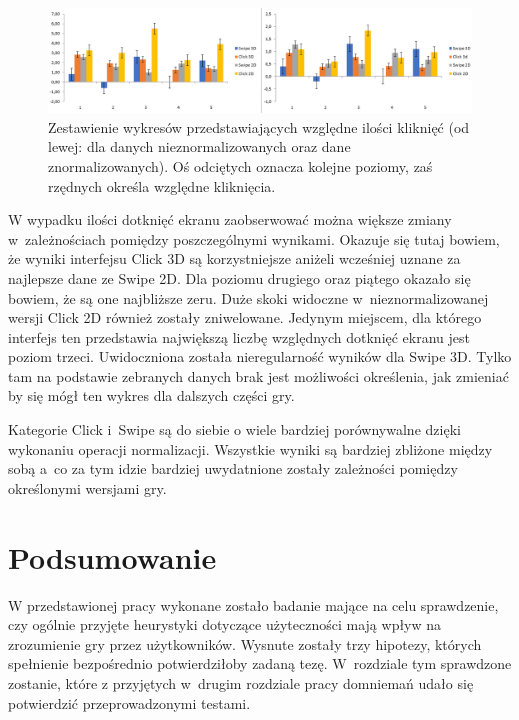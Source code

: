 \documentclass[a4paper,12pt,numbers=noenddot]{report}
\begin{document}
\begin{figure}[h!]
	\centering
  	\includegraphics[width=\linewidth]{diag/rel_mean_ClicksNorm.png}
	\caption{Zestawienie wykresów przedstawiających względne ilości kliknięć (od lewej: dla danych nieznormalizowanych oraz dane znormalizowanych). Oś odciętych oznacza kolejne poziomy, zaś rzędnych określa względne kliknięcia.}
	\label{fig:diag:rel:mean_ClicksNorm}
\end{figure}
W wypadku ilości dotknięć ekranu zaobserwować można większe zmiany w~zależnościach pomiędzy poszczególnymi wynikami. Okazuje się tutaj bowiem, że wyniki interfejsu Click 3D są korzystniejsze aniżeli wcześniej uznane za najlepsze dane ze Swipe 2D. Dla poziomu drugiego oraz piątego okazało się bowiem, że są one najbliższe zeru. Duże skoki widoczne w~nieznormalizowanej wersji Click 2D również zostały zniwelowane. Jedynym miejscem, dla którego interfejs ten przedstawia największą liczbę względnych dotknięć ekranu jest poziom trzeci.
Uwidoczniona została nieregularność wyników dla Swipe 3D. Tylko tam na podstawie zebranych danych brak jest możliwości określenia, jak zmieniać by się mógł ten wykres dla dalszych części gry.

Kategorie Click i~Swipe są do siebie o wiele bardziej porównywalne dzięki wykonaniu operacji normalizacji. Wszystkie wyniki są bardziej zbliżone między sobą a~co za tym idzie bardziej uwydatnione zostały zależności pomiędzy określonymi wersjami gry.

\chapter{Podsumowanie}

W przedstawionej pracy wykonane zostało badanie mające na celu sprawdzenie, czy ogólnie przyjęte heurystyki dotyczące użyteczności mają wpływ na zrozumienie gry przez użytkowników. Wysnute zostały trzy hipotezy, których spełnienie bezpośrednio potwierdziłoby zadaną tezę. W~rozdziale tym sprawdzone zostanie, które z przyjętych w~drugim rozdziale pracy domniemań udało się potwierdzić przeprowadzonymi testami.
\end{document}
